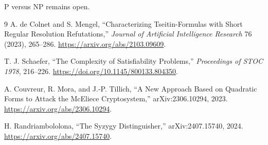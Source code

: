 \documentclass[11pt]{article}
\begin{document}
P versus NP remains open.

\begin{thebibliography}{9}
A. de Colnet and S. Mengel,
``Characterizing Tseitin-Formulas with Short Regular Resolution Refutations,''
\emph{Journal of Artificial Intelligence Research} 76 (2023), 265--286.
\url{https://arxiv.org/abs/2103.09609}.

T. J. Schaefer,
``The Complexity of Satisfiability Problems,''
\emph{Proceedings of STOC 1978}, 216--226.
\url{https://doi.org/10.1145/800133.804350}.

A. Couvreur, R. Mora, and J.-P. Tillich,
``A New Approach Based on Quadratic Forms to Attack the McEliece
Cryptosystem,'' arXiv:2306.10294, 2023.
\url{https://arxiv.org/abs/2306.10294}.

H. Randriambololona,
``The Syzygy Distinguisher,'' arXiv:2407.15740, 2024.
\url{https://arxiv.org/abs/2407.15740}.
\end{thebibliography}
\end{document}
